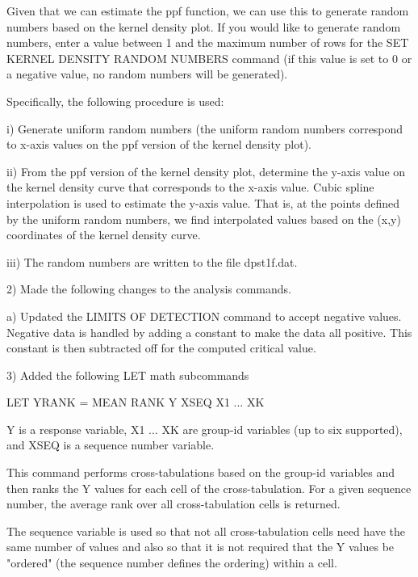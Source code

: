     Given that we can estimate the ppf function, we can use this to
    generate random numbers based on the kernel density plot.  If you
    would like to generate random numbers, enter a value between 1 and
    the maximum number of rows for the SET KERNEL DENSITY RANDOM NUMBERS
    command (if this value is set to 0 or a negative value, no random
    numbers will be generated).

    Specifically, the following procedure is used:

        i) Generate uniform random numbers (the uniform random numbers
           correspond to x-axis values on the ppf version of the kernel
           density plot).

       ii) From the ppf version of the kernel density plot, determine
           the y-axis value on the kernel density curve that corresponds
           to the x-axis value.  Cubic spline interpolation is used to
           estimate the y-axis value.  That is, at the points defined
           by the uniform random numbers, we find interpolated values
           based on the (x,y) coordinates of the kernel density curve.

      iii) The random numbers are written to the file dpst1f.dat.

 2) Made the following changes to the analysis commands.

    a) Updated the LIMITS OF DETECTION command to accept negative values.
       Negative data is handled by adding a constant to make the data all
       positive.  This constant is then subtracted off for the computed
       critical value.

 3) Added the following LET math subcommands

      LET YRANK = MEAN RANK Y XSEQ X1 ... XK

    Y is a response variable, X1 ... XK are group-id variables (up to
    six supported), and XSEQ is a sequence number variable.

    This command performs cross-tabulations based on the group-id
    variables and then ranks the Y values for each cell of the
    cross-tabulation.  For a given sequence number, the average rank over
    all cross-tabulation cells is returned.

    The sequence variable is used so that not all cross-tabulation cells
    need have the same number of values and also so that it is not
    required that the Y values be "ordered" (the sequence number defines the
    ordering) within a cell.

